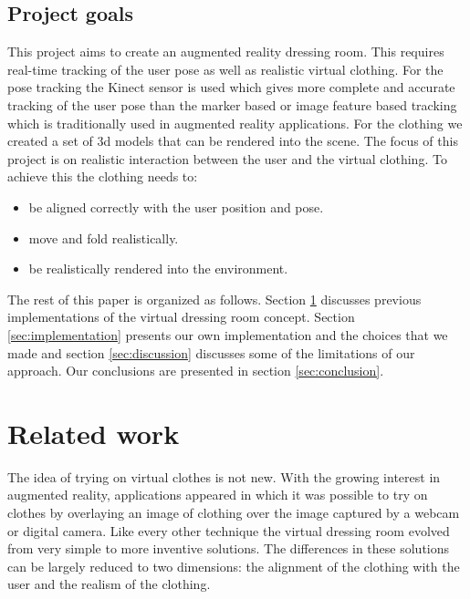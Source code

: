 \documentclass[twocolumn,a4paper]{article}
\begin{document}

\subsection{Project goals}
\label{sec:project_goals}

This project aims to create an augmented reality dressing room. This requires real-time tracking of the user pose as well as realistic virtual clothing. For the pose tracking the Kinect sensor is used which gives more complete and accurate tracking of the user pose than the marker based or image feature based tracking which is traditionally used in augmented reality applications. For the clothing we created a set of 3d models that can be rendered into the scene. The focus of this project is on realistic interaction between the user and the virtual clothing. To achieve this the clothing needs to:
\begin{itemize}
\setlength{\itemsep}{0pt}
  \setlength{\parskip}{0pt}
  \setlength{\parsep}{0pt}
\item be aligned correctly with the user position and pose.
\item move and fold realistically. 
\item be realistically rendered into the environment.
\end{itemize}

The rest of this paper is organized as follows. Section \ref{sec:related_work} discusses previous implementations of the virtual dressing room concept. Section \ref{sec:implementation} presents our own implementation and the choices that we made and section \ref{sec:discussion} discusses some of the limitations of our approach. Our conclusions are presented in section \ref{sec:conclusion}.


\section{Related work}
\label{sec:related_work}

The idea of trying on virtual clothes is not new. With the growing interest in augmented reality, applications appeared in which it was possible to try on clothes by overlaying an image of clothing over the image captured by a webcam or digital camera. Like every other technique the virtual dressing room evolved from very simple to more inventive solutions. The differences in these solutions can be largely reduced to two dimensions: the alignment of the clothing with the user and the realism of the clothing.
\end{document}
